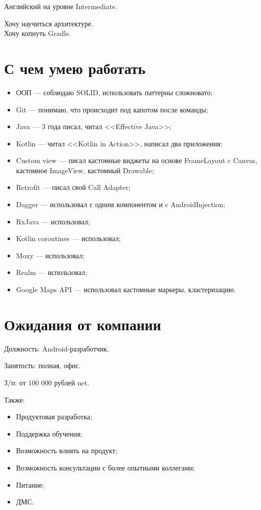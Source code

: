 \documentclass[a4paper,12pt]{article}
\begin{document}
    Английский на уровне Intermediate.

    Хочу научиться архитектуре.\\
    Хочу копнуть Gradle.

    \section*{С чем умею работать}%

    \begin{itemize}
        \item ООП --- соблюдаю SOLID, использовать паттерны сложновато;
        \item Git --- понимаю, что происходит под капотом после команды;
        \item Java --- 3 года писал, читал <<Effective Java>>;
        \item Kotlin --- читал <<Kotlin in Action>>, написал два приложения;
        \item Custom view --- писал кастомные виджеты на основе FrameLayout c Canvas, кастомное ImageView, кастомный Drawable;
        \item Retrofit --- писал свой Call Adapter;
        \item Dagger --- использовал с одним компонентом и c AndroidInjection;
        \item RxJava --- использовал;
        \item Kotlin coroutines --- использовал;
        \item Moxy --- использовал;
        \item Realm --- использовал;
        \item Google Maps API --- использовал кастомные маркеры, кластеризацию.
    \end{itemize}

    \section*{Ожидания от компании}

    Должность: Android-разработчик.\par
    Занятость: полная, офис.\par
    З/п: от 100 000 рублей net.\par
    Также:
    \begin{itemize}
        \item Продуктовая разработка;
        \item Поддержка обучения;
        \item Возможность влиять на продукт;
        \item Возможность консультации с более опытными коллегами;
        \item Питание;
        \item ДМС.
    \end{itemize}
\end{document}
